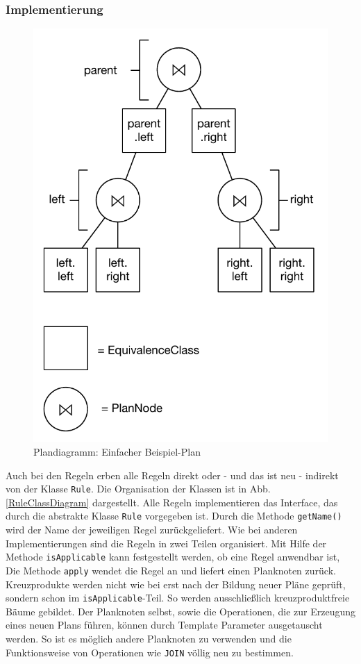 \subsubsection{Implementierung}


\begin{figure}[ht]
  \centering
  \includegraphics[scale=0.75]{04_Implementierung/00_media/Plan.pdf}
  \caption{Plandiagramm: Einfacher Beispiel-Plan}
  \label{SimplePlan}
\end{figure}


Auch bei den Regeln erben alle Regeln direkt oder - und das ist neu - indirekt von der Klasse \texttt{Rule}. Die Organisation der Klassen ist in Abb. \ref{RuleClassDiagram} dargestellt. Alle Regeln implementieren das Interface, das durch die abstrakte Klasse \texttt{Rule} vorgegeben ist. Durch die Methode \texttt{getName()} wird der Name der jeweiligen Regel zurückgeliefert. Wie bei anderen Implementierungen sind die Regeln in zwei Teilen organisiert. Mit Hilfe der Methode \texttt{isApplicable} kann festgestellt werden, ob eine Regel anwendbar ist, Die Methode \texttt{apply} wendet die Regel an und liefert einen Planknoten zurück. Kreuzprodukte werden nicht wie bei \cite{shanbhag2014optimizing} erst nach der Bildung neuer Pläne geprüft, sondern schon im \texttt{isApplicable}-Teil. So werden ausschließlich kreuzproduktfreie Bäume gebildet. Der Planknoten selbst, sowie die Operationen, die zur Erzeugung eines neuen Plans führen, können durch Template Parameter ausgetauscht werden. So ist es möglich andere Planknoten zu verwenden und die Funktionsweise von Operationen wie \texttt{JOIN} völlig neu zu bestimmen.


